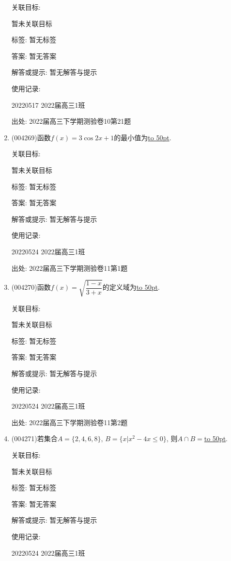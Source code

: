 \documentclass[10pt,a4paper]{article}
\newcommand{\blank}[1]{\underline{\hbox to #1pt{}}}
\begin{document}
\begin{enumerate}[1.]
关联目标:

暂未关联目标



标签: 暂无标签

答案: 暂无答案

解答或提示: 暂无解答与提示

使用记录:

20220517	2022届高三1班			


出处: 2022届高三下学期测验卷10第21题
\item { (004269)}函数$f(x)=3\cos 2x+1$的最小值为\blank{50}.


关联目标:

暂未关联目标



标签: 暂无标签

答案: 暂无答案

解答或提示: 暂无解答与提示

使用记录:

20220524	2022届高三1班	


出处: 2022届高三下学期测验卷11第1题
\item { (004270)}函数$f(x)=\sqrt{\dfrac{1-x}{3+x}}$的定义域为\blank{50}.


关联目标:

暂未关联目标



标签: 暂无标签

答案: 暂无答案

解答或提示: 暂无解答与提示

使用记录:

20220524	2022届高三1班	


出处: 2022届高三下学期测验卷11第2题
\item { (004271)}若集合$A=\{2,4,6,8\}$, $B=\{x|x^2-4x\le 0\}$, 则$A\cap B=$\blank{50}.


关联目标:

暂未关联目标



标签: 暂无标签

答案: 暂无答案

解答或提示: 暂无解答与提示

使用记录:

20220524	2022届高三1班	



\end{enumerate}
\end{document}
